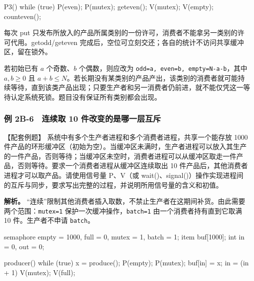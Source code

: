 \par\medskip\noindent\begin{minipage}{\linewidth}
\begin{codeblock}[language={}]
P3() {
    while (true) {
        P(even);
        P(mutex);
        geteven();
        V(mutex);
        V(empty);
        counteven();
    }
}
\end{codeblock}
\end{minipage}\par\medskip

每次 put 只发布所放入的产品所属类别的一份许可，消费者不能拿另一类别的许可代用。getodd/geteven 完成后，空位可立刻交还；各自的统计不访问共享缓冲区，留在锁外。

若初始已有 \(a\) 个奇数、\(b\) 个偶数，则应改为 \texttt{odd=\allowbreak{}a,\allowbreak{} even=\allowbreak{}b,\allowbreak{} empty=\allowbreak{}N-a-b}，其中 \(a,b\ge0\) 且 \(a+b\le N\)。若长期没有某类别的产品产出，该类别的消费者就可能持续等待，直到该类产品出现；只要生产者和另一消费者仍前进，就不能仅凭这一等待认定系统死锁。题目没有保证所有类别都会出现。

\subsubsection{例 2B-6　连续取 10 件改变的是哪一层互斥}\label{OS02-ex-2014}

\begin{example}[配套例题]

【配套例题】 系统中有多个生产者进程和多个消费者进程，共享一个能存放 1000 件产品的环形缓冲区（初始为空）。当缓冲区未满时，生产者进程可以放入其生产的一件产品，否则等待；当缓冲区未空时，消费者进程可以从缓冲区取走一件产品，否则等待。要求一个消费者进程从缓冲区连续取出 10 件产品后，其他消费者进程才可以取产品。请使用信号量 P、V（或 wait()、signal()）操作实现进程间的互斥与同步，要求写出完整的过程，并说明所用信号量的含义和初值。

\end{example}

\textbf{解析。} ``连续''限制其他消费者插入取数，不禁止生产者在这期间补货。由此需要两个范围：\texttt{mutex=\allowbreak{}1} 保护一次缓冲操作，\texttt{batch=\allowbreak{}1} 由一个消费者持有直到它取满 10 件。生产者不申请 \texttt{batch}。

\par\medskip\noindent\begin{minipage}{\linewidth}
\begin{codeblock}[language={}]
semaphore empty = 1000, full = 0, mutex = 1, batch = 1;
item buf[1000];
int in = 0, out = 0;

producer() {
    while (true) {
        x = produce();
        P(empty);
        P(mutex);
        buf[in] = x;
        in = (in + 1) %
        V(mutex);
        V(full);
    }
}
\end{codeblock}
\end{minipage}\par\medskip

